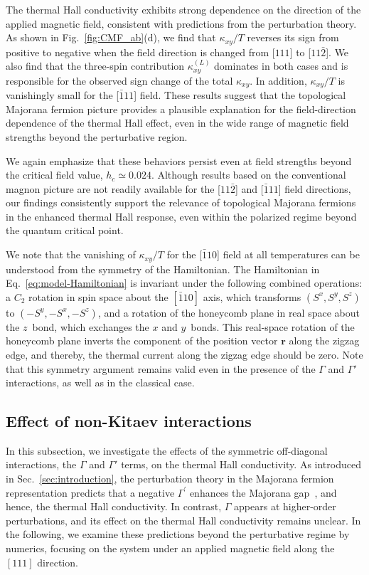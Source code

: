 \documentclass[twocolumn,superscriptaddress,showpacs, longbibliography, aps, prx]{revtex4-2}
\begin{document}
The thermal Hall conductivity exhibits strong dependence on the direction of the applied magnetic field, consistent with predictions from the perturbation theory.
As shown in Fig.~\ref{fig:CMF_ab}(d), we find that $\kappa_{xy}/T$ reverses its sign from positive to negative when the field direction is changed from [$111$] to  [$11\bar{2}$]. 
We also find that the three-spin contribution $\kappa_{xy}^{(L)}$ dominates in both cases and is responsible for the observed sign change of the total $\kappa_{xy}$.
In addition, $\kappa_{xy}/T$ is vanishingly small for the [$\bar{1}11$] field. 
These results suggest that the topological Majorana fermion picture provides a plausible explanation for the field-direction dependence of the thermal Hall effect, even in the wide range of magnetic field strengths beyond the perturbative region. 

We again emphasize that these behaviors persist even at field strengths beyond the critical field value, $h_c \simeq 0.024$. 
Although results based on the conventional magnon picture are not readily available for the [$11\bar{2}$] and [$\bar{1}11$] field directions, our findings consistently support the relevance of topological Majorana fermions in the enhanced thermal Hall response, even within the polarized regime beyond the quantum critical point. 

We note that the vanishing of $\kappa_{xy}/T$ for the [$\bar{1}10$] field at all temperatures can be understood from the symmetry of the Hamiltonian.
The Hamiltonian in Eq.~\eqref{eq:model-Hamiltonian} is invariant under the following combined operations: 
a $C_2$ rotation in spin space about the $[\bar{1}10]$ axis, which transforms $(S^x,S^y,S^z)$ to $(-S^y,-S^x,-S^z)$, and a rotation of the honeycomb plane in real space about the $z$~bond, which exchanges the $x$ and $y$~bonds.
This real-space rotation of the honeycomb plane inverts the component of the position vector $\bm{r}$ along the zigzag edge, and thereby, the thermal current along the zigzag edge should be zero.
Note that this symmetry argument remains valid even in the presence of the $\Gamma$ and $\Gamma'$ interactions, as well as in the classical case.


\subsection{Effect of non-Kitaev interactions}
\label{sec:Gamma}
In this subsection, we investigate the effects of the symmetric off-diagonal interactions, the $\Gamma$ and $\Gamma'$ terms, on the thermal Hall conductivity.
As introduced in Sec.~\ref{sec:introduction}, the perturbation theory in the Majorana fermion representation predicts that a negative $\Gamma^{\prime}$ enhances the Majorana gap~\cite{TakikawaF2020}, and hence, the thermal Hall conductivity. 
In contrast, $\Gamma$ appears at higher-order perturbations, and its effect on the thermal Hall conductivity remains unclear.
In the following, we examine these predictions beyond the perturbative regime by numerics, focusing on the system under an applied magnetic field along the $[111]$ direction.
\end{document}
